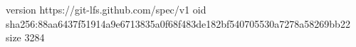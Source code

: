 version https://git-lfs.github.com/spec/v1
oid sha256:88aa6437f51914a9e6713835a0f68f483de182bf540705530a7278a58269bb22
size 3284
